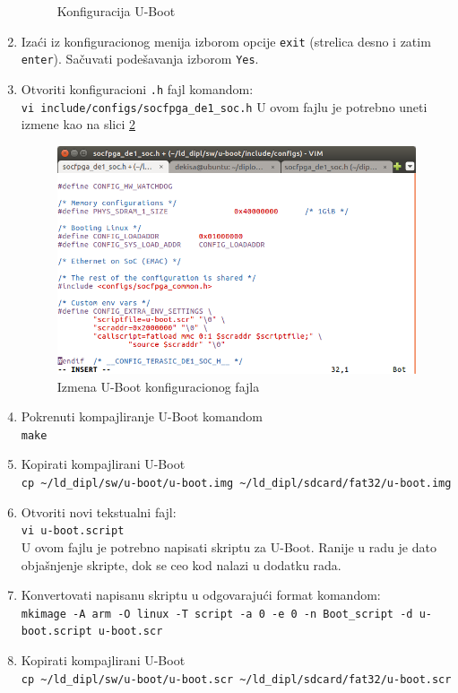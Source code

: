 \begin{enumerate}
\begin{figure}[h!]
\caption{Konfiguracija U-Boot}
\label{slika:uboot}
\end{figure}
\item Izaći iz konfiguracionog menija izborom opcije \texttt{exit} (strelica desno i zatim \texttt{enter}). Sačuvati podešavanja izborom \texttt{Yes}.
\item Otvoriti konfiguracioni \texttt{.h} fajl komandom:\\
\texttt{vi include/configs/socfpga\_de1\_soc.h}
U ovom fajlu je potrebno uneti izmene kao na slici \ref{slika:uboot10}
\begin{figure}[h!]
\centering
\includegraphics[scale=0.6, trim={0 15 10 60},clip]{img/uboot1.png}
\caption{Izmena U-Boot konfiguracionog fajla}
\label{slika:uboot10}
\end{figure}
\item Pokrenuti kompajliranje U-Boot komandom\\
\texttt{make}
\item Kopirati kompajlirani U-Boot\\
\texttt{cp \textasciitilde/ld\_dipl/sw/u-boot/u-boot.img \textasciitilde/ld\_dipl/sdcard/fat32/u-boot.img }
\item Otvoriti novi tekstualni fajl:\\
\texttt{vi u-boot.script}\\
U ovom fajlu je potrebno napisati skriptu za U-Boot. Ranije u radu je dato objašnjenje skripte, dok se ceo kod nalazi u dodatku rada.
\item Konvertovati napisanu skriptu u odgovarajući format komandom:\\
\texttt{mkimage -A arm -O linux -T script -a 0 -e 0 -n Boot\_script -d u-boot.script u-boot.scr}
\item Kopirati kompajlirani U-Boot\\
\texttt{cp \textasciitilde/ld\_dipl/sw/u-boot/u-boot.scr \textasciitilde/ld\_dipl/sdcard/fat32/u-boot.scr }


\end{enumerate}
